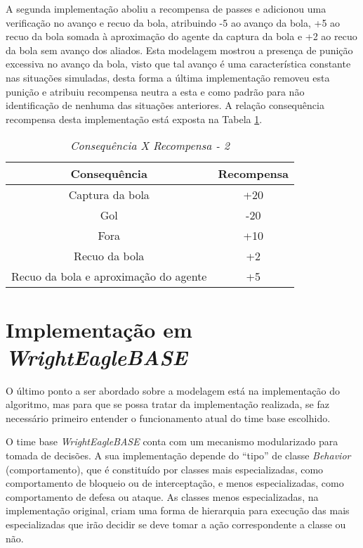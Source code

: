 A segunda implementação aboliu a recompensa de passes e adicionou uma
verificação no avanço e recuo da bola, atribuindo -5 ao avanço da bola, +5 ao
recuo da bola somada à aproximação do agente da captura da bola e +2 ao recuo da
bola sem avanço dos aliados. Esta modelagem mostrou a presença de 
punição excessiva no avanço da bola, visto que tal avanço é uma
característica constante nas situações simuladas, desta forma a última
implementação removeu esta punição e atribuiu recompensa neutra a esta e como
padrão para não identificação de nenhuma das situações anteriores. A relação
consequência recompensa desta implementação está exposta na Tabela
\ref{tab:rewards2}.

\begin{table}[hbt]
    \centering
    \begin{tabular}{c|c}
        Consequência    &   Recompensa  \\ \hline
        Captura da bola &   +20 \\
        Gol             &   -20 \\
        Fora            &   +10 \\
        Recuo da bola   &   +2  \\
        Recuo da bola e
        aproximação do
        agente          &   +5 \\
    \end{tabular}
    \caption{\textit{Consequência X Recompensa - 2}}
    \label{tab:rewards2}
\end{table}

\section{Implementação em \textit{WrightEagleBASE}}\label{implementacao}

O último ponto a ser abordado sobre a modelagem está na implementação do
algoritmo, mas para que se possa tratar da implementação realizada, se faz
necessário primeiro entender o funcionamento atual do time base escolhido.

O time base \textit{WrightEagleBASE} conta com um mecanismo modularizado para
tomada de decisões. A sua implementação depende do ``tipo'' de classe
\textit{Behavior} (comportamento), que é constituído por classes mais
especializadas, como comportamento de bloqueio ou de interceptação, e menos
especializadas, como comportamento de defesa ou ataque. As classes menos
especializadas, na implementação original, criam uma forma de hierarquia para
execução das mais especializadas que irão decidir se deve tomar a ação
correspondente a classe ou não. 

